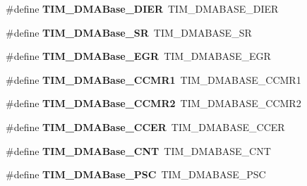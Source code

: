 \begin{DoxyCompactItemize}
\#define {\bfseries T\+I\+M\+\_\+\+D\+M\+A\+Base\+\_\+\+D\+I\+ER}~T\+I\+M\+\_\+\+D\+M\+A\+B\+A\+S\+E\+\_\+\+D\+I\+ER
\item 
\mbox{\label{group___h_a_l___t_i_m___aliased___defines_ga5cda07a11a76bbb24a7d5bb680814d31}} 
\#define {\bfseries T\+I\+M\+\_\+\+D\+M\+A\+Base\+\_\+\+SR}~T\+I\+M\+\_\+\+D\+M\+A\+B\+A\+S\+E\+\_\+\+SR
\item 
\mbox{\label{group___h_a_l___t_i_m___aliased___defines_gab5e6f6c3fea100896d13ce317a6ccd8e}} 
\#define {\bfseries T\+I\+M\+\_\+\+D\+M\+A\+Base\+\_\+\+E\+GR}~T\+I\+M\+\_\+\+D\+M\+A\+B\+A\+S\+E\+\_\+\+E\+GR
\item 
\mbox{\label{group___h_a_l___t_i_m___aliased___defines_gaab384496cff3e54d8179fc0db727c7ee}} 
\#define {\bfseries T\+I\+M\+\_\+\+D\+M\+A\+Base\+\_\+\+C\+C\+M\+R1}~T\+I\+M\+\_\+\+D\+M\+A\+B\+A\+S\+E\+\_\+\+C\+C\+M\+R1
\item 
\mbox{\label{group___h_a_l___t_i_m___aliased___defines_ga4989f74592ab359f30bd7c4a4a457571}} 
\#define {\bfseries T\+I\+M\+\_\+\+D\+M\+A\+Base\+\_\+\+C\+C\+M\+R2}~T\+I\+M\+\_\+\+D\+M\+A\+B\+A\+S\+E\+\_\+\+C\+C\+M\+R2
\item 
\mbox{\label{group___h_a_l___t_i_m___aliased___defines_ga6935639db5738662520e8d0eb7116dd6}} 
\#define {\bfseries T\+I\+M\+\_\+\+D\+M\+A\+Base\+\_\+\+C\+C\+ER}~T\+I\+M\+\_\+\+D\+M\+A\+B\+A\+S\+E\+\_\+\+C\+C\+ER
\item 
\mbox{\label{group___h_a_l___t_i_m___aliased___defines_gacab604257d144cf3a59b360cbc958ec9}} 
\#define {\bfseries T\+I\+M\+\_\+\+D\+M\+A\+Base\+\_\+\+C\+NT}~T\+I\+M\+\_\+\+D\+M\+A\+B\+A\+S\+E\+\_\+\+C\+NT
\item 
\mbox{\label{group___h_a_l___t_i_m___aliased___defines_gab8dd06970f235fe9f6997e0975237388}} 
\#define {\bfseries T\+I\+M\+\_\+\+D\+M\+A\+Base\+\_\+\+P\+SC}~T\+I\+M\+\_\+\+D\+M\+A\+B\+A\+S\+E\+\_\+\+P\+SC
\item 
\mbox{\label{group___h_a_l___t_i_m___aliased___defines_gaab8a66f70e59b5916b4bba344746d652}} 

\end{DoxyCompactItemize}
